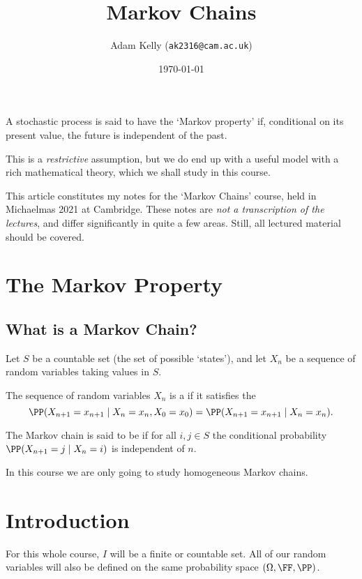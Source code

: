 \documentclass[a4paper]{scrartcl}
\title{Markov Chains}
\author{Adam Kelly (\texttt{ak2316@cam.ac.uk})}
\date{\today}
\begin{document}
\maketitle

A stochastic process is said to have the `Markov property' if, conditional on its present value, the future is independent of the past.

This is a \emph{restrictive} assumption, but we do end up with a useful model with a rich mathematical theory, which we shall study in this course.

This article constitutes my notes for the `Markov Chains' course, held in Michaelmas 2021 at Cambridge. These notes are \emph{not a transcription of the lectures}, and differ significantly in quite a few areas. Still, all lectured material should be covered.


\tableofcontents


\section{The Markov Property}

\subsection{What is a Markov Chain?}

Let $S$ be a countable set (the set of possible `states'), and let $X_n$ be a sequence of random variables taking values in $S$.

\begin{definition}
	The sequence of random variables $X_n$ is a  if it satisfies the 
	$$
	\PP(X_{n + 1} = x_{n + 1} \mid X_n = x_n, X_0 = x_0) = \PP(X_{n + 1} = x_{n + 1} \mid X_n = x_n).
	$$

	The Markov chain is said to be  if for all $i, j \in S$ the conditional probability $\PP(X_{n + 1} = j \mid X_n = i)$ is independent of $n$.
\end{definition}

In this course we are only going to study homogeneous Markov chains.


\section{Introduction}

For this whole course, $I$ will be a finite or countable set. All of our random variables will also be defined on the same probability space $(\Omega, \FF, \PP)$.
\end{document}
